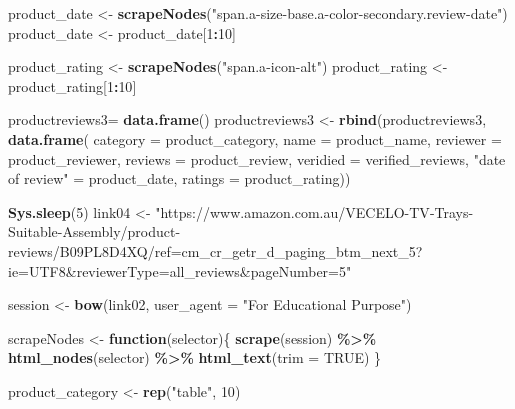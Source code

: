 \documentclass[
]{article}
\newenvironment{Shaded}{\begin{snugshade}}{\end{snugshade}}
\newcommand{\AttributeTok}[1]{\textcolor[rgb]{0.13,0.29,0.53}{#1}}
\newcommand{\ConstantTok}[1]{\textcolor[rgb]{0.56,0.35,0.01}{#1}}
\newcommand{\ControlFlowTok}[1]{\textcolor[rgb]{0.13,0.29,0.53}{\textbf{#1}}}
\newcommand{\DecValTok}[1]{\textcolor[rgb]{0.00,0.00,0.81}{#1}}
\newcommand{\FunctionTok}[1]{\textcolor[rgb]{0.13,0.29,0.53}{\textbf{#1}}}
\newcommand{\NormalTok}[1]{#1}
\newcommand{\OtherTok}[1]{\textcolor[rgb]{0.56,0.35,0.01}{#1}}
\newcommand{\SpecialCharTok}[1]{\textcolor[rgb]{0.81,0.36,0.00}{\textbf{#1}}}
\newcommand{\StringTok}[1]{\textcolor[rgb]{0.31,0.60,0.02}{#1}}
\begin{document}
\begin{Shaded}
\begin{Highlighting}[]
\NormalTok{  product\_date }\OtherTok{\textless{}{-}} \FunctionTok{scrapeNodes}\NormalTok{(}\StringTok{"span.a{-}size{-}base.a{-}color{-}secondary.review{-}date"}\NormalTok{)}
\NormalTok{  product\_date }\OtherTok{\textless{}{-}}\NormalTok{ product\_date[}\DecValTok{1}\SpecialCharTok{:}\DecValTok{10}\NormalTok{]}
  
\NormalTok{  product\_rating }\OtherTok{\textless{}{-}} \FunctionTok{scrapeNodes}\NormalTok{(}\StringTok{"span.a{-}icon{-}alt"}\NormalTok{)}
\NormalTok{  product\_rating }\OtherTok{\textless{}{-}}\NormalTok{ product\_rating[}\DecValTok{1}\SpecialCharTok{:}\DecValTok{10}\NormalTok{]}
  
\NormalTok{  productreviews3}\OtherTok{=} \FunctionTok{data.frame}\NormalTok{()}
\NormalTok{  productreviews3 }\OtherTok{\textless{}{-}} \FunctionTok{rbind}\NormalTok{(productreviews3, }\FunctionTok{data.frame}\NormalTok{(}
                      \AttributeTok{category =}\NormalTok{ product\_category,}
                      \AttributeTok{name =}\NormalTok{ product\_name,}
                      \AttributeTok{reviewer =}\NormalTok{ product\_reviewer,}
                      \AttributeTok{reviews =}\NormalTok{ product\_review,}
                      \AttributeTok{veridied =}\NormalTok{ verified\_reviews,}
                      \StringTok{"date of review"} \OtherTok{=}\NormalTok{ product\_date,}
                      \AttributeTok{ratings =}\NormalTok{ product\_rating))}
  
   \FunctionTok{Sys.sleep}\NormalTok{(}\DecValTok{5}\NormalTok{)}
\NormalTok{link04 }\OtherTok{\textless{}{-}} \StringTok{"https://www.amazon.com.au/VECELO{-}TV{-}Trays{-}Suitable{-}Assembly/product{-}reviews/B09PL8D4XQ/ref=cm\_cr\_getr\_d\_paging\_btm\_next\_5?ie=UTF8\&reviewerType=all\_reviews\&pageNumber=5"}


\NormalTok{  session }\OtherTok{\textless{}{-}} \FunctionTok{bow}\NormalTok{(link02,}
               \AttributeTok{user\_agent =} \StringTok{"For Educational Purpose"}\NormalTok{)}

\NormalTok{  scrapeNodes }\OtherTok{\textless{}{-}} \ControlFlowTok{function}\NormalTok{(selector)\{}
    \FunctionTok{scrape}\NormalTok{(session) }\SpecialCharTok{\%\textgreater{}\%}
      \FunctionTok{html\_nodes}\NormalTok{(selector) }\SpecialCharTok{\%\textgreater{}\%}
      \FunctionTok{html\_text}\NormalTok{(}\AttributeTok{trim =} \ConstantTok{TRUE}\NormalTok{)}
\NormalTok{  \}}

\NormalTok{  product\_category }\OtherTok{\textless{}{-}} \FunctionTok{rep}\NormalTok{(}\StringTok{"table"}\NormalTok{, }\DecValTok{10}\NormalTok{)}


\end{Highlighting}
\end{Shaded}
\end{document}
